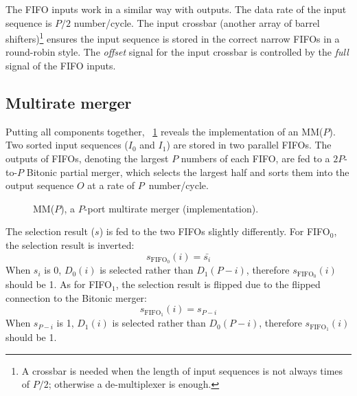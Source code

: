 \documentclass[10pt, conference]{IEEEtran}
\begin{document}
The FIFO inputs work in a similar way with outputs. The data rate of the input sequence is $P/2$ number/cycle.
The input crossbar (another array of barrel shifters)\footnote{A crossbar is needed when the length of input sequences is not always times of $P/2$;
otherwise a de-multiplexer is enough.} ensures the input sequence is stored in the correct narrow FIFOs in a round-robin style.
The \emph{offset} signal for the input crossbar is controlled by the \emph{full} signal of the FIFO inputs.

\subsection{Multirate merger}\label{sec_pmerger_imp}

Putting all components together, \figurename~\ref{fig_pmerger_imp} reveals the implementation of an MM($P$).
Two sorted input sequences ($I_0$ and $I_1$) are stored in two parallel FIFOs.
The outputs of FIFOs, denoting the largest $P$ numbers of each FIFO, are fed to a $2P$-to-$P$ Bitonic partial merger,
which selects the largest half and sorts them into the output sequence $O$ at a rate of $P$~number/cycle. 

\begin{figure}[bt]
\caption{MM($P$), a $P$-port multirate merger (implementation).}\label{fig_pmerger_imp}
\end{figure}

The selection result ($s$) is fed to the two FIFOs slightly differently. For FIFO$_0$, the selection result is inverted:
\begin{equation}
s_{\text{FIFO}_0}(i) = \bar{s_i}
\end{equation}
When $s_i$ is 0, $D_0(i)$ is selected rather than $D_1(P-i)$, therefore $s_{\text{FIFO}_0}(i)$ should be 1.
As for FIFO$_1$, the selection result is flipped due to the flipped connection to the Bitonic merger:
\begin{equation}
s_{\text{FIFO}_1}(i) =s_{P-i}
\end{equation}
When $s_{P-i}$ is 1, $D_1(i)$ is selected rather than $D_0(P-i)$, therefore $s_{\text{FIFO}_1}(i)$ should be 1.
\end{document}
